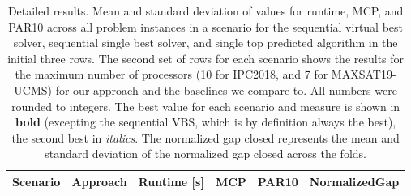 \begin{table}[t]
\begin{center}
    {\caption[Detailed Results: Runtime, MCP, PAR10, and Normalized Gap Closed for $AS_{p_{\cap}}$ vs. Baselines PC2018 and MAXSAT19-UCMS Scenarios]{Detailed results. Mean and standard deviation of values for runtime, MCP, and PAR10 across all problem instances in a scenario for the sequential virtual best solver, sequential single best solver, and single top predicted algorithm in the initial three rows. The second set of rows for each scenario shows the results for the maximum number of processors (10 for IPC2018, and 7 for MAXSAT19-UCMS) for our approach and the baselines we compare to. All numbers were rounded to integers. The best value for each scenario and measure is shown in \textbf{bold} (excepting the sequential VBS, which is by definition always the best), the second best in \textit{italics}. The normalized gap closed represents the mean and standard deviation of the normalized gap closed across the folds.}\label{tab:summary}}
    \scriptsize\begin{tabular}{clcccc}
    \toprule
        Scenario & Approach & Runtime [s] & MCP & PAR10 & NormalizedGap\\
    \midrule
    

\end{tabular}
\end{center}
\end{table}
